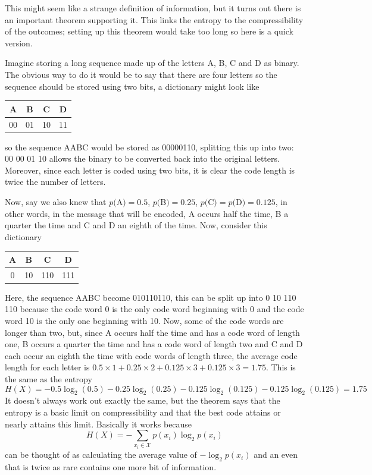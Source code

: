 \documentclass[11pt,a4paper]{scrartcl}
\begin{document}
This might seem like a strange definition of information, but it turns
out there is an important theorem supporting it. This links the
entropy to the compressibility of the outcomes; setting up this
theorem would take too long so here is a quick version. 

Imagine storing a long sequence made up of the letters A, B, C and D
as binary. The obvious way to do it would be to say that there are
four letters so the sequence should be stored using two bits, a
dictionary might look like
\begin{center}
\begin{tabular}{cccc}
A&B&C&D\\
\hline
00&01&10&11
\end{tabular}
\end{center}
so the sequence AABC would be stored as 00000110, splitting this up
into two: 00 00 01 10 allows the binary to be converted back into the
original letters. Moreover, since each letter is coded using two bits,
it is clear the code length is twice the number of letters. 

Now, say we also knew that $p($A$)=0.5$, $p($B$)=0.25$,
$p($C$)=p($D$)=0.125$, in other words, in the message that will be
encoded, A occurs half the time, B a quarter the time and C and D an
eighth of the time. Now, consider this dictionary
\begin{center}
\begin{tabular}{cccc}
A&B&C&D\\
\hline
0&10&110&111
\end{tabular}
\end{center}
Here, the sequence AABC become 010110110, this can be split up into 0
10 110 110 because the code word 0 is the only code word beginning
with 0 and the code word 10 is the only one beginning with 10. Now,
some of the code words are longer than two, but, since A occurs half
the time and has a code word of length one, B occurs a quarter the
time and has a code word of length two and C and D each occur an
eighth the time with code words of length three, the average code
length for each letter is $0.5\times 1 +0.25\times 2 + 0.125\times 3 +
0.125\times 3=1.75$. This is the same as the entropy
\begin{equation}
H(X)=-0.5\log_2(0.5)-0.25\log_2(0.25)-0.125\log_2(0.125)-0.125\log_2(0.125)=1.75
\end{equation}
It doesn't always work out exactly the same, but the theorem says that
the entropy is a basic limit on compressibility and that the best code
attains or nearly attains this limit. Basically it works because
\begin{equation}
H(X)=-\sum_{x_i\in \mathcal{X}}{p(x_i)\log_2p(x_i)}
\end{equation}
can be thought of as calculating the average value of $-\log_2p(x_i)$
and an even that is twice as rare contains one more bit of
information.
\end{document}
